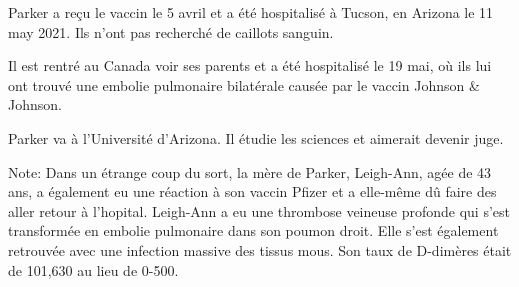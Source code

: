 Parker a reçu le vaccin le 5 avril et a été hospitalisé à Tucson, en Arizona le
11 may 2021. Ils n'ont pas recherché de caillots sanguin.

Il est rentré au Canada voir ses parents et a été hospitalisé le 19 mai, où ils
lui ont trouvé une embolie pulmonaire bilatérale causée par le vaccin
Johnson \& Johnson.

Parker va à l'Université d'Arizona. Il étudie les sciences et aimerait devenir
juge.

Note: Dans un étrange coup du sort, la mère de Parker, Leigh-Ann, agée de 43
ans, a également eu une réaction à son vaccin Pfizer et a elle-même dû faire des
aller retour à l'hopital. Leigh-Ann a eu une thrombose veineuse profonde qui
s'est transformée en embolie pulmonaire dans son poumon droit. Elle s'est
également retrouvée avec une infection massive des tissus mous. Son taux de
D-dimères était de 101,630 au lieu de 0-500.

